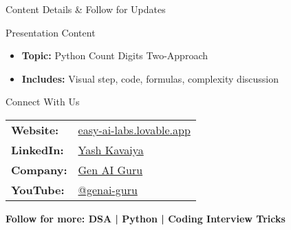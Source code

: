 \documentclass[aspectratio=169]{beamer}
\begin{document}
{
\begin{frame}[fragile]{Content Details \& Follow for Updates}
\begin{block}{Presentation Content}
\begin{itemize}
\item \textbf{Topic:} Python Count Digits Two-Approach
\item \textbf{Includes:} Visual step, code, formulas, complexity discussion
\end{itemize}
\end{block}

\begin{block}{Connect With Us}
\centering
\begin{tabular}{ll}
\textcolor{GoogleBlue}{\textbf{Website:}} & \href{https://easy-ai-labs.lovable.app/}{easy-ai-labs.lovable.app} \\
\textcolor{GoogleRed}{\textbf{LinkedIn:}} & \href{https://www.linkedin.com/in/yashkavaiya}{Yash Kavaiya} \\
\textcolor{GoogleGreen}{\textbf{Company:}} & \href{https://www.linkedin.com/company/genai-guru}{Gen AI Guru} \\
\textcolor{GoogleYellow!80!black}{\textbf{YouTube:}} & \href{https://www.youtube.com/@genai-guru}{@genai-guru} \\
\end{tabular}
\end{block}

\begin{center}
\colorbox{GoogleBlue!10}{\begin{minipage}{11cm}
\centering
\textbf{Follow for more: DSA | Python | Coding Interview Tricks}
\end{minipage}}
\end{center}
\end{frame}
}
\end{document}

